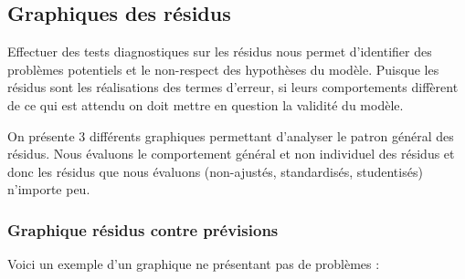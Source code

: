 \documentclass[french]{article}
\begin{document}
\begin{multicols*}{2}
\columnbreak
\subsection{Graphiques des résidus}
\begin{rappel_enhanced}[Contexte]
Effectuer des tests diagnostiques sur les résidus nous permet d'identifier des problèmes potentiels et le non-respect des hypothèses du modèle. Puisque les résidus sont les réalisations des termes d'erreur, si leurs comportements diffèrent de ce qui est attendu on doit mettre en question la validité du modèle.

\bigskip

On présente 3 différents graphiques permettant d'analyser le patron général des résidus. Nous évaluons le comportement général et non individuel des résidus et donc les résidus que nous évaluons (non-ajustés, standardisés, studentisés) n'importe peu.
\end{rappel_enhanced}


\subsubsection{Graphique résidus contre prévisions}
Voici un exemple d'un graphique ne présentant pas de problèmes :
\begin{center}
\begin{tikzpicture}[x=0.75pt,y=0.75pt,yscale=-1,xscale=1]


\end{tikzpicture}
\end{center}
\end{multicols*}
\end{document}
